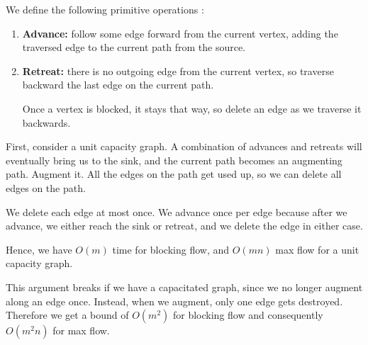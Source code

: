 \documentclass{article}
\begin{document}
  We define the following primitive operations :
  \begin{enumerate}
  \item \textbf{Advance:} follow some edge forward from the current vertex, adding the traversed edge to the current path from the source.
  
  \item \textbf{Retreat:} there is no outgoing edge from the current vertex, so traverse backward the last edge on the current path.
  
  Once a vertex is blocked, it stays that way, so delete an edge as we traverse it backwards.
  \end{enumerate}
  First, consider a unit capacity graph.  A combination of advances and retreats will eventually bring us to the sink, and the current path becomes an augmenting path. Augment it. All the edges on the path get used up, so we can delete all edges on the path.
  
  We delete each edge at most once. We advance once per edge because after we advance, we either reach the sink or retreat, and we delete the edge in either case.
  
  Hence, we have $O(m)$ time for blocking flow, and $O(mn)$ max flow for a unit capacity graph.
  
  This argument breaks if we have a capacitated graph, since we no longer augment along an edge once. Instead, when we augment, only one edge gets destroyed. Therefore we get a bound of $O(m^2)$ for blocking flow and consequently $O(m^2n)$ for max flow.
\end{document}
